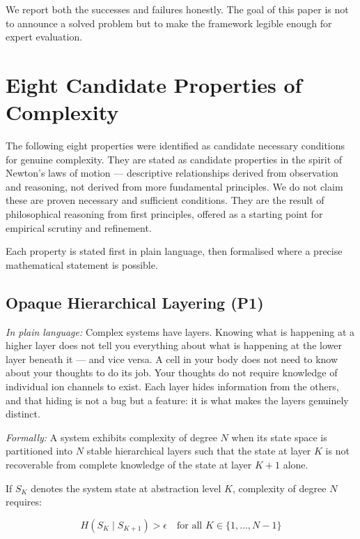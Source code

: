 \documentclass[12pt,a4paper]{article}
\begin{document}
We report both the successes and failures honestly.
The goal of this paper is not to announce a solved problem but to make
the framework legible enough for expert evaluation.

\section{Eight Candidate Properties of Complexity}

The following eight properties were identified as candidate necessary
conditions for genuine complexity.
They are stated as candidate properties in the spirit of Newton's laws of
motion — descriptive relationships derived from observation and reasoning,
not derived from more fundamental principles.
We do not claim these are proven necessary and sufficient conditions.
They are the result of philosophical reasoning from first principles,
offered as a starting point for empirical scrutiny and refinement.

Each property is stated first in plain language, then formalised where
a precise mathematical statement is possible.

\subsection{Opaque Hierarchical Layering (P1)}

\textit{In plain language:} Complex systems have layers. Knowing what
is happening at a higher layer does not tell you everything about what
is happening at the lower layer beneath it — and vice versa.
A cell in your body does not need to know about your thoughts to do its
job. Your thoughts do not require knowledge of individual ion channels to
exist. Each layer hides information from the others, and that hiding is
not a bug but a feature: it is what makes the layers genuinely distinct.

\textit{Formally:} A system exhibits complexity of degree $N$ when its
state space is partitioned into $N$ stable hierarchical layers such that
the state at layer $K$ is not recoverable from complete knowledge of the
state at layer $K+1$ alone.

If $S_K$ denotes the system state at abstraction level $K$, complexity
of degree $N$ requires:

\begin{equation}
H(S_K \mid S_{K+1}) > \epsilon \quad \text{for all } K \in \{1, \ldots, N-1\}
\end{equation}
\end{document}
